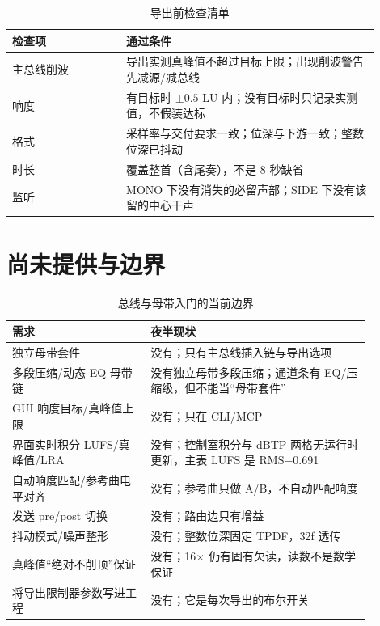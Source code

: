 \begin{table}[htbp]
\centering
\small
\begin{tabular}{@{}p{0.28\linewidth}p{0.62\linewidth}@{}}
\hline
检查项 & 通过条件 \\
\hline
主总线削波 & 导出实测真峰值不超过目标上限；出现削波警告先减源/减总线 \\
响度 & 有目标时 $\pm0.5$ LU 内；没有目标时只记录实测值，不假装达标 \\
格式 & 采样率与交付要求一致；位深与下游一致；整数位深已抖动 \\
时长 & 覆盖整首（含尾奏），不是 8 秒缺省 \\
监听 & MONO 下没有消失的必留声部；SIDE 下没有该留的中心干声 \\
\hline
\end{tabular}
\caption{导出前检查清单}
\label{tab:export-checklist}
\end{table}

\section{尚未提供与边界}

\begin{table}[htbp]
\centering
\small
\begin{tabular}{@{}p{0.34\linewidth}p{0.54\linewidth}@{}}
\hline
需求 & 夜半现状 \\
\hline
独立母带套件 & 没有；只有主总线插入链与导出选项 \\
多段压缩/动态 EQ 母带链 & 没有独立母带多段压缩；通道条有 EQ/压缩级，但不能当“母带套件” \\
GUI 响度目标/真峰值上限 & 没有；只在 CLI/MCP \\
界面实时积分 LUFS/真峰值/LRA & 没有；控制室积分与 dBTP 两格无运行时更新，主表 LUFS 是 RMS−0.691 \\
自动响度匹配/参考曲电平对齐 & 没有；参考曲只做 A/B，不自动匹配响度 \\
发送 pre/post 切换 & 没有；路由边只有增益 \\
抖动模式/噪声整形 & 没有；整数位深固定 TPDF，32f 透传 \\
真峰值“绝对不削顶”保证 & 没有；16× 仍有固有欠读，读数不是数学保证 \\
将导出限制器参数写进工程 & 没有；它是每次导出的布尔开关 \\
\hline
\end{tabular}
\caption{总线与母带入门的当前边界}
\label{tab:mastering-gaps}
\end{table}

